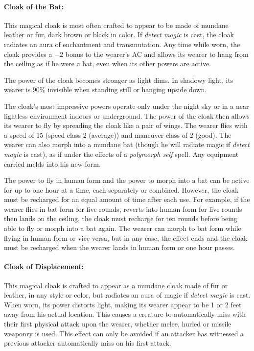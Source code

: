 \begin{multicols}{2}
\paragraph{Cloak of the Bat:} This magical cloak is most often crafted to appear to be made of mundane leather or fur, dark brown or black in color.  If \textit{detect magic} is cast, the cloak radiates an aura of enchantment and transmutation.  Any time while worn, the cloak provides a $-2$ bonus to the wearer's AC and allows its wearer to hang from the ceiling as if he were a bat, even when its other powers are active.

The power of the cloak becomes stronger as light dims.  In shadowy light, its wearer is 90\% invisible when standing still or hanging upside down.

The cloak's most impressive powers operate only under the night sky or in a near lightless environment indoors or underground.  The power of the cloak then allows its wearer to fly by spreading the cloak like a pair of wings.  The wearer flies with a speed of 15 (speed class 2 (average)) and maneuver class of 2 (good).  The wearer can also morph into a mundane bat (though he will radiate magic if \textit{detect magic} is cast), as if under the effects of a \textit{polymorph self} spell.  Any equipment carried melds into his new form.

The power to fly in human form and the power to morph into a bat can be active for up to one hour at a time, each separately or combined.  However, the cloak must be recharged for an equal amount of time after each use.  For example, if the wearer flies in bat form for five rounds, reverts into human form for five rounds then lands on the ceiling, the cloak must recharge for ten rounds before being able to fly or morph into a bat again.  The wearer can morph to bat form while flying in human form or vice versa, but in any case, the effect ends and the cloak must be recharged when the wearer lands in human form or one hour passes.

\paragraph{Cloak of Displacement:} This magical cloak is crafted to appear as a mundane cloak made of fur or leather, in any style or color, but radiates an aura of magic if \textit{detect magic} is cast.  When worn, its power distorts light, making its wearer appear to be 1 or 2 feet away from his actual location.  This causes a creature to automatically miss with their first physical attack upon the wearer, whether melee, hurled or missile weaponry is used.  This effect can only be avoided if an attacker has witnessed a previous attacker automatically miss on his first attack.


\end{multicols}
